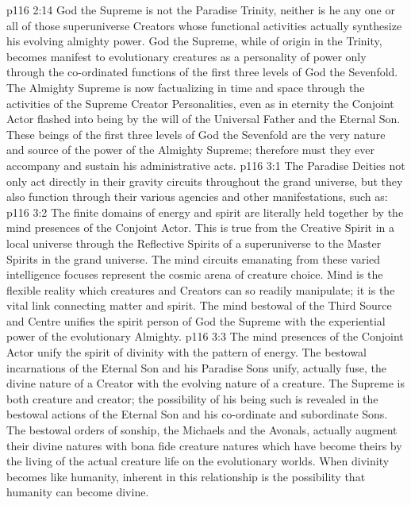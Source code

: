 \vs p116 2:14 God the Supreme is not the Paradise Trinity, neither is he any one or all of those superuniverse Creators whose functional activities actually synthesize his evolving almighty power. God the Supreme, while of origin in the Trinity, becomes manifest to evolutionary creatures as a personality of power only through the co\hyp{}ordinated functions of the first three levels of God the Sevenfold. The Almighty Supreme is now factualizing in time and space through the activities of the Supreme Creator Personalities, even as in eternity the Conjoint Actor flashed into being by the will of the Universal Father and the Eternal Son. These beings of the first three levels of God the Sevenfold are the very nature and source of the power of the Almighty Supreme; therefore must they ever accompany and sustain his administrative acts.
\vs p116 3:1 The Paradise Deities not only act directly in their gravity circuits throughout the grand universe, but they also function through their various agencies and other manifestations, such as:
\vs p116 3:2 \bibnobreakspace {} The finite domains of energy and spirit are literally held together by the mind presences of the Conjoint Actor. This is true from the Creative Spirit in a local universe through the Reflective Spirits of a superuniverse to the Master Spirits in the grand universe. The mind circuits emanating from these varied intelligence focuses represent the cosmic arena of creature choice. Mind is the flexible reality which creatures and Creators can so readily manipulate; it is the vital link connecting matter and spirit. The mind bestowal of the Third Source and Centre unifies the spirit person of God the Supreme with the experiential power of the evolutionary Almighty.
\vs p116 3:3 \bibnobreakspace {} The mind presences of the Conjoint Actor unify the spirit of divinity with the pattern of energy. The bestowal incarnations of the Eternal Son and his Paradise Sons unify, actually fuse, the divine nature of a Creator with the evolving nature of a creature. The Supreme is both creature and creator; the possibility of his being such is revealed in the bestowal actions of the Eternal Son and his co\hyp{}ordinate and subordinate Sons. The bestowal orders of sonship, the Michaels and the Avonals, actually augment their divine natures with bona fide creature natures which have become theirs by the living of the actual creature life on the evolutionary worlds. When divinity becomes like humanity, inherent in this relationship is the possibility that humanity can become divine.
